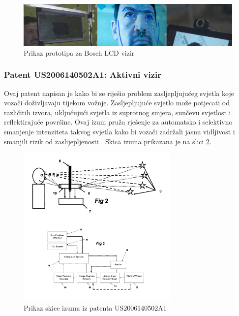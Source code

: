\documentclass{foi}
\begin{document}
\begin{figure}[h!]
    \centering
    \includegraphics[width=1\textwidth]{slike/bosch-virtual-visor-2}
    \caption{Prikaz prototipa za Bosch LCD vizir \cite{Chris}}
    \label{fig:bosch_lcd_2}
\end{figure}

\subsubsection{Patent US2006140502A1: Aktivni vizir}

Ovaj patent napisan je kako bi se riješio problem zasljepljujućeg svjetla koje vozači doživljavaju tijekom vožnje. Zasljepljujuće svjetlo može potjecati od različitih izvora, uključujući svjetla iz suprotnog smjera, sunčevu svjetlost i reflektirajuće površine. Ovaj izum pruža rješenje za automatsko i selektivno smanjenje intenziteta takvog svjetla kako bi vozači zadržali jasnu vidljivost i smanjili rizik od zaslijepljenosti \cite{Allan2006}. Skica izuma prikazana je na slici \ref{fig:patent1}.

\begin{figure}[h!]
    \centering
    \includegraphics[width=0.7\textwidth]{slike/patent1}
    \caption{Prikaz skice izuma iz patenta US2006140502A1 \cite{Allan2006}}
    \label{fig:patent1}
\end{figure}
\end{document}
